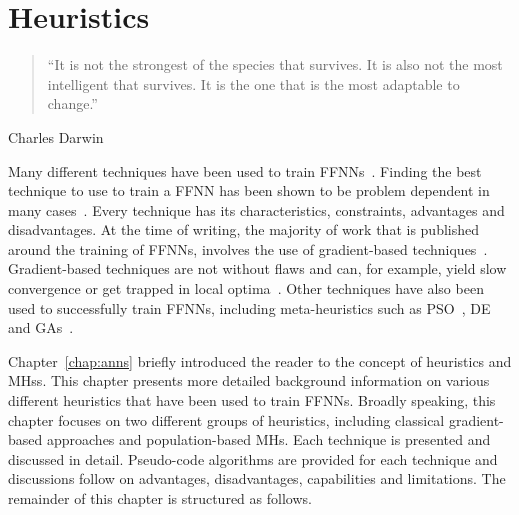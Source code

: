 \chapter{Heuristics}\label{chap:heuristics}

\begin{quotation}
      \noindent ``It is not the strongest of the species that survives. It is also not the most intelligent that survives. It is the one that is the most adaptable to change.''
\end{quotation}
\begin{flushright}
      Charles Darwin
\end{flushright}

\noindent
Many different techniques have been used to train \acp{FFNN}~\cite{ref:kingma:2014}. Finding the best technique to use to train a \acs{FFNN} has been shown to be problem dependent in many cases~\cite{ref:kheiri:2017}. Every technique has its characteristics, constraints, advantages and disadvantages. At the time of writing, the majority of work that is published around the training of \acp{FFNN}, involves the use of gradient-based techniques~\cite{ref:nel:2021}. Gradient-based techniques are not without flaws and can, for example, yield slow convergence or get trapped in local optima~\cite{ref:mingguang:2009}. Other techniques have also been used to successfully train \acp{FFNN}, including meta-heuristics such as \acf{PSO}~\cite{ref:rakitianskaia:2012, ref:vanwyk:2014}, \acf{DE}~\cite{ref:espinal:2011} and \acfp{GA}~\cite{ref:gupta:1999}.

Chapter~\ref{chap:anns} briefly introduced the reader to the concept of heuristics and \acfp{MH}s. This chapter presents more detailed background information on various different heuristics that have been used to train \acp{FFNN}. Broadly speaking, this chapter focuses on two different groups of heuristics, including classical gradient-based approaches and population-based \acp{MH}. Each technique is presented and discussed in detail. Pseudo-code algorithms are provided for each technique and discussions follow on advantages, disadvantages, capabilities and limitations. The remainder of this chapter is structured as follows.

